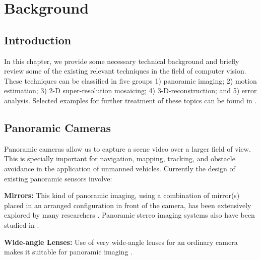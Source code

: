 \chapter{Background} \label{chap:background}
\graphicspath{{./bg/fig/}}

%

\section{Introduction}

In this chapter, we provide some necessary technical background and briefly review some of the
existing relevant techniques in the field of computer vision. These techniques can be classified in
five groups 1) panoramic imaging; 2) motion estimation; 3) 2-D super-resolution mosaicing; 4)
3-D-reconstruction; and 5) error analysis. Selected examples for further treatment of these topics
can be found in \cite{mil77, soa98, soa98p, sze99, tia96, tom92, ura89, wax87, wen87}.


\section{Panoramic Cameras}

Panoramic cameras allow us to capture a scene video over a larger field of view. This is specially
important for navigation, mapping, tracking, and obstacle avoidance in the application of unmanned
vehicles. Currently the design of existing panoramic sensors involve:

\bi

\item {\bf Mirrors:} This kind of panoramic imaging, using a combination of mirror(s) placed in an
arranged configuration in front of the camera, has been extensively explored by many researchers
\cite{bak98,bru99,gro01,nay97-2,nay97-1,pri01,swa01,tan02,yok98}. Panoramic stereo imaging systems
also have been studied in \cite{ben01,bha98,ish92,nay01,nen98,pel00}.

\item {\bf Wide-angle Lenses:} Use of very wide-angle lenses for an ordinary camera makes it
suitable for panoramic imaging \cite{gre86,gro01,zhu00,zhu99}.

